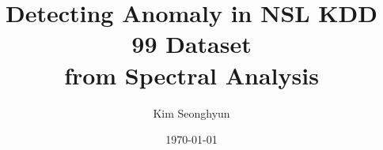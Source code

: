 \title{Detecting Anomaly in NSL KDD 99 Dataset \\ from Spectral Analysis}
\author{Kim Seonghyun}
\date{\today}
